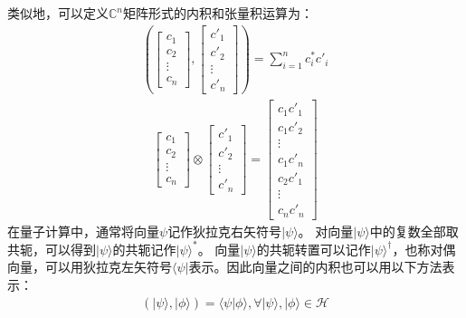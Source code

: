 类似地，可以定义\(\mathbb{C}^n\)矩阵形式的内积和张量积运算为：
\begin{align}
    \left(\left[\begin{matrix}
        c_1\\c_2\\\vdots\\c_n
    \end{matrix}\right]
    ,\left[\begin{matrix}
        c'_1\\c'_2\\\vdots\\c'_n
    \end{matrix}\right]\right)=
    \sum_{i=1}^{n}c_i^* c'_i
\end{align}
\begin{align}
    \left[\begin{matrix}
        c_1\\c_2\\\vdots\\c_n
    \end{matrix}\right]
    \otimes\left[\begin{matrix}
        c'_1\\c'_2\\\vdots\\c'_n
    \end{matrix}\right]=\left[\begin{matrix}
        c_1c'_1\\c_1c'_2\\\vdots\\c_1c'_n\\c_2c'_1\\\vdots\\c_n c'_n
    \end{matrix}\right]
\end{align}
在量子计算中，通常将向量\(\psi\)记作狄拉克右矢符号\(|\psi\rangle\)。
对向量\(|\psi\rangle\)中的复数全部取共轭，可以得到\(|\psi\rangle\)的共轭记作\(|\psi\rangle^*\)。
向量\(|\psi\rangle\)的共轭转置可以记作\(|\psi\rangle^\dagger\)，也称对偶向量，可以用狄拉克左矢符号\(\langle\psi|\)表示。因此向量之间的内积也可以用以下方法表示：
\begin{align}
    (|\psi\rangle, |\phi\rangle)=\langle \psi|\phi\rangle , \forall |\psi \rangle, |\phi \rangle\in \mathcal{H}
\end{align}

